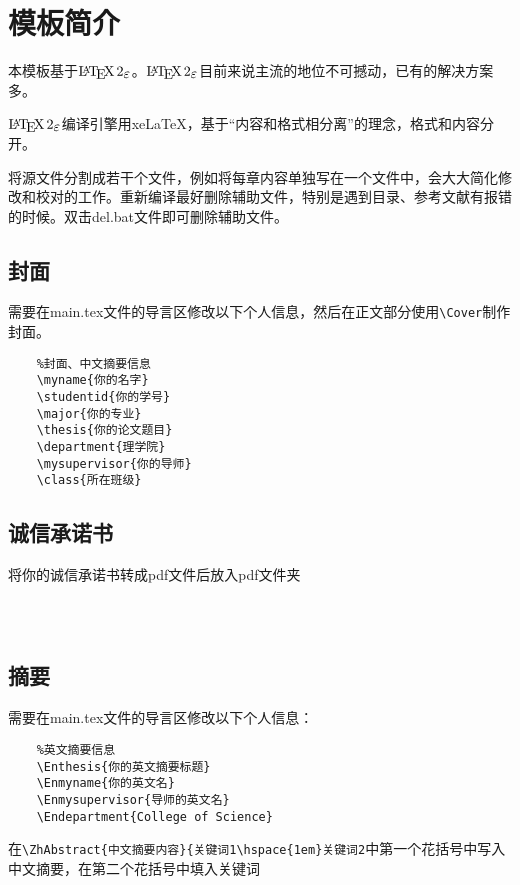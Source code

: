 \section{模板简介}

本模板基于$\LaTeXe$。$\LaTeXe$目前来说主流的地位不可撼动，已有的解决方案多。

$\LaTeXe$编译引擎用xeLaTeX，基于“内容和格式相分离”的理念，格式和内容分开。

将源文件分割成若干个文件，例如将每章内容单独写在一个文件中，会大大简化修改和校对的工作。重新编译最好删除辅助文件，特别是遇到目录、参考文献有报错的时候。双击del.bat文件即可删除辅助文件。




\subsection{封面}

需要在main.tex文件的导言区修改以下个人信息，然后在正文部分使用\verb|\Cover|制作封面。

\begin{lstlisting}
	%封面、中文摘要信息
	\myname{你的名字}
	\studentid{你的学号}
	\major{你的专业}
	\thesis{你的论文题目}
	\department{理学院}
	\mysupervisor{你的导师}
	\class{所在班级}
\end{lstlisting}


\subsection{诚信承诺书}

将你的诚信承诺书转成pdf文件后放入pdf文件夹

\begin{lstlisting}
	
	
\end{lstlisting}

\subsection{摘要}

需要在main.tex文件的导言区修改以下个人信息：

\begin{lstlisting}
	%英文摘要信息
	\Enthesis{你的英文摘要标题}
	\Enmyname{你的英文名}
	\Enmysupervisor{导师的英文名}
	\Endepartment{College of Science}
\end{lstlisting}

在\verb|\ZhAbstract{中文摘要内容}{关键词1\hspace{1em}关键词2|中第一个花括号中写入中文摘要，在第二个花括号中填入关键词

